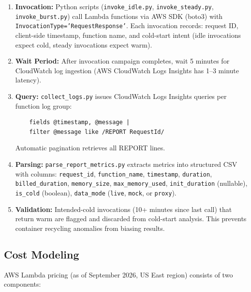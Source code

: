 \begin{enumerate}
    \item \textbf{Invocation:} Python scripts (\texttt{invoke\_idle.py}, \texttt{invoke\_steady.py}, \texttt{invoke\_burst.py}) call Lambda functions via AWS SDK (boto3) with \texttt{InvocationType='RequestResponse'}. Each invocation records: request ID, client-side timestamp, function name, and cold-start intent (idle invocations expect cold, steady invocations expect warm).
    
    \item \textbf{Wait Period:} After invocation campaign completes, wait 5 minutes for CloudWatch log ingestion (AWS CloudWatch Logs Insights has 1–3 minute latency).
    
    \item \textbf{Query:} \texttt{collect\_logs.py} issues CloudWatch Logs Insights queries per function log group:
    \begin{verbatim}
    fields @timestamp, @message | 
    filter @message like /REPORT RequestId/
    \end{verbatim}
    Automatic pagination retrieves all REPORT lines.
    
    \item \textbf{Parsing:} \texttt{parse\_report\_metrics.py} extracts metrics into structured CSV with columns: \texttt{request\_id}, \texttt{function\_name}, \texttt{timestamp}, \texttt{duration}, \texttt{billed\_duration}, \texttt{memory\_size}, \texttt{max\_memory\_used}, \texttt{init\_duration} (nullable), \texttt{is\_cold} (boolean), \texttt{data\_mode} (\texttt{live}, \texttt{mock}, or \texttt{proxy}).
    
    \item \textbf{Validation:} Intended-cold invocations (10+ minutes since last call) that return warm are flagged and discarded from cold-start analysis. This prevents container recycling anomalies from biasing results.
\end{enumerate}


\subsection{Cost Modeling}
\label{sec:cost_model}

AWS Lambda pricing (as of September 2026, US East region) consists of two components:

